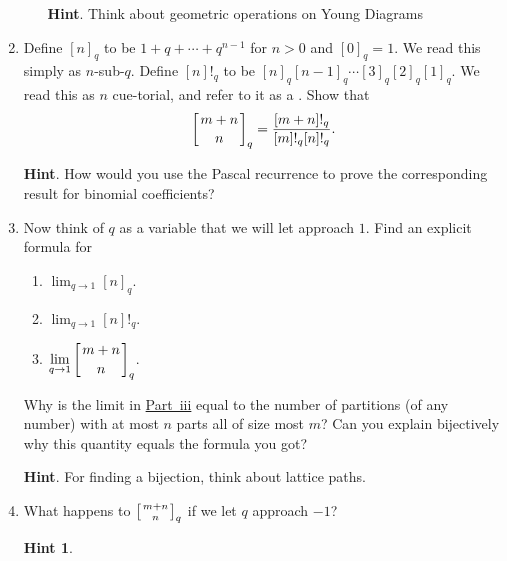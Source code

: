 \documentclass{book}
\begin{document}
\begin{activity}
\begin{enumerate}[font=\bfseries,label=(\alph*),ref=\alph*]
\begin{enumerate}[font=\bfseries,label=(\roman*),ref=\theenumi.\roman*]
\par\smallskip%
\noindent\textbf{Hint}.\hypertarget{hint-220}{}\quad%
\hypertarget{p-1633}{}%
Think about geometric operations on Young Diagrams%
\par\smallskip%
\noindent\end{enumerate}
\item\label{task-287} \hypertarget{p-1635}{}%
Define \([n]_q\) to be \(1+q+\cdots+q^{n-1}\) for \(n>0\) and \([0]_q =1\).  We read this simply as \(n\)-sub-\(q\). Define \([n]!_q\) to be \([n]_q[n-1]_q\cdots [3]_q[2]_q[1]_q\). We read this as \(n\) cue-torial, and refer to it as a . Show that%
\begin{equation*}
\left[{m+n\atop n}\right]_q = \frac{[m+n]!_q}{[m]!_q[n]!_q}.
\end{equation*}
%
\par\smallskip%
\noindent\textbf{Hint}.\hypertarget{hint-221}{}\quad%
\hypertarget{p-1636}{}%
How would you use the Pascal recurrence to prove the corresponding result for binomial coefficients?%
\par\smallskip%
\noindent\item\label{task-288} \hypertarget{p-1639}{}%
Now think of \(q\) as a variable that we will let approach \(1\). Find an explicit formula for \leavevmode%
\begin{enumerate}[label=(\roman*)]
\item\hypertarget{li-64}{}\(\displaystyle\lim_{q\rightarrow 1} [n]_q\).%
\item\hypertarget{li-65}{}\(\displaystyle\lim_{q\rightarrow 1} [n]!_q\).%
\item\hypertarget{q-binomial-lim}{}\(\displaystyle\lim_{q\rightarrow 1} \left[{m+n\atop n}\right]_q\).%
\end{enumerate}
 Why is the limit in \hyperlink{q-binomial-lim}{Part~iii} equal to the number of partitions (of any number) with at most \(n\) parts all of size most \(m\)? Can you explain bijectively why this quantity equals the formula you got?%
\par\smallskip%
\noindent\textbf{Hint}.\hypertarget{hint-222}{}\quad%
\hypertarget{p-1640}{}%
For finding a bijection, think about lattice paths.%
\par\smallskip%
\noindent\item\label{task-289} \hypertarget{p-1642}{}%
What happens to \(\left[{m+n\atop n}\right]_q\) if we let \(q\) approach \(-1\)?%
\par\smallskip%
\noindent\textbf{Hint 1}.\hypertarget{hint-223}{}\quad%

\end{enumerate}
\end{activity}
\end{document}

